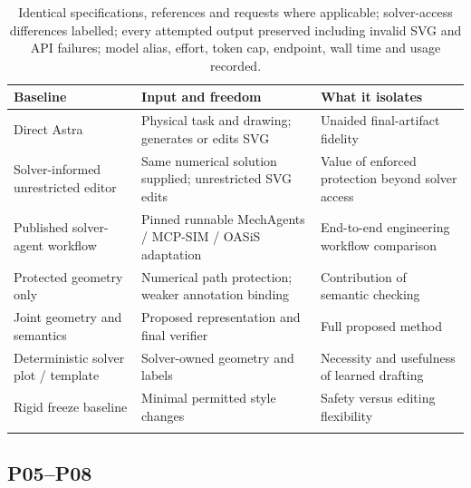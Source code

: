 \documentclass[11pt,a4paper]{article}
\begin{document}
\begin{longtable}{L{4.0cm} L{5.4cm} L{5.4cm}}
\toprule
Baseline & Input and freedom & What it isolates \\
\midrule
Direct Astra & Physical task and drawing; generates or edits SVG & Unaided final-artifact fidelity \\
Solver-informed unrestricted editor & Same numerical solution supplied; unrestricted SVG edits & Value of enforced protection beyond solver access \\
Published solver-agent workflow & Pinned runnable MechAgents / MCP-SIM / OASiS adaptation & End-to-end engineering workflow comparison \\
Protected geometry only & Numerical path protection; weaker annotation binding & Contribution of semantic checking \\
Joint geometry and semantics & Proposed representation and final verifier & Full proposed method \\
Deterministic solver plot / template & Solver-owned geometry and labels & Necessity and usefulness of learned drafting \\
Rigid freeze baseline & Minimal permitted style changes & Safety versus editing flexibility \\
\bottomrule
\caption[]{Identical specifications, references and requests where applicable; solver-access differences labelled; every attempted output preserved including invalid SVG and API failures; model alias, effort, token cap, endpoint, wall time and usage recorded.}
\end{longtable}

\subsection{P05--P08}
\end{document}
